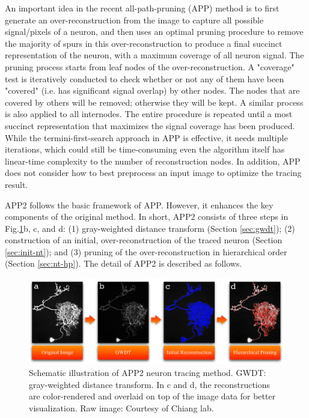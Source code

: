 An important idea in the recent all-path-pruning (APP) method \cite{peng2011automatic} is to first generate an over-reconstruction from the image to capture all possible signal/pixels of a neuron, and then uses an optimal pruning procedure to remove the majority of spurs in this over-reconstruction to produce a final succinct representation of the neuron, with a maximum coverage of all neuron signal. The pruning process starts from leaf nodes of the over-reconstruction. A "coverage" test is iteratively conducted to check whether or not any of them have been "covered" (i.e. has significant signal overlap) by other nodes. The nodes that are covered by others will be removed; otherwise they will be kept. A similar process is also applied to all internodes. The entire procedure is repeated until a most succinct representation that maximizes the signal coverage has been produced. While the termini-first-search approach in APP is effective, it needs multiple iterations, which could still be time-consuming even the algorithm itself has linear-time complexity to the number of reconstruction nodes. In addition, APP does not consider how to best preprocess an input image to optimize the tracing result. 

APP2 follows the basic framework of APP. However, it enhances the key components of the original method. In short, APP2 consists of three steps in Fig.\ref{fig:autont-fig1}b, c, and d: (1) gray-weighted distance transform (Section \ref{sec:gwdt}); (2) construction of an initial, over-reconstruction of the traced neuron (Section \ref{sec:init-nt}); and (3) pruning of the over-reconstruction in hierarchical order (Section \ref{sec:nt-hp}). The detail of APP2 is described as follows.

\begin{figure}[htbp]
\centering
\includegraphics[width=1.0\textwidth]{images/autont_fig1}
\caption[Schematic illustration of APP2 neuron tracing method]{Schematic illustration of APP2 neuron tracing method. GWDT: gray-weighted distance transform. In c and d, the reconstructions are color-rendered and overlaid on top of the image data for better visualization. Raw image: Courtesy of Chiang lab.}
\label{fig:autont-fig1}
\end{figure}
